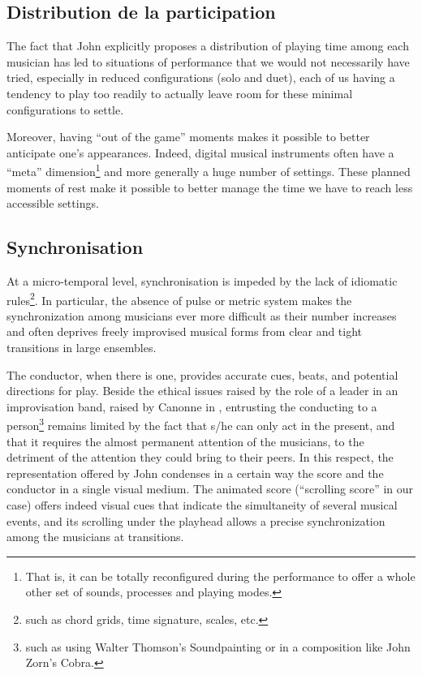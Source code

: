 \subsection{Distribution de la participation}

The fact that John explicitly proposes a distribution of playing time among each musician has led to situations of performance that we would not necessarily have tried, especially in reduced configurations (solo and duet), each of us having a tendency to play too readily to actually leave room for these minimal configurations to settle.

Moreover, having “out of the game” moments makes it possible to better anticipate one's appearances. Indeed, digital musical instruments often have a “meta” dimension\footnote{That is, it can be totally reconfigured during the performance to offer a whole other set of sounds, processes and playing modes.} and more generally a huge number of settings. These planned moments of rest make it possible to better manage the time we have to reach less accessible settings.

\subsection{Synchronisation}

At a micro-temporal level, synchronisation is impeded by the lack of idiomatic rules\footnote{such as chord grids, time signature, scales, etc.}. In particular, the absence of pulse or metric system makes the synchronization among musicians ever more difficult as their number increases and often deprives freely improvised musical forms from clear and tight transitions in large ensembles.

The conductor, when there is one, provides accurate cues, beats, and potential directions for play. Beside the ethical issues raised by the role of a leader in an improvisation band, raised by Canonne in \cite{canonne_improvisation_2012}, entrusting the conducting to a person\footnote{such as using Walter Thomson's Soundpainting or in a composition like John Zorn's Cobra.} remains limited by the fact that s/he can only act in the present, and that it requires the almost permanent attention of the musicians, to the detriment of the attention they could bring to their peers. In this respect, the representation offered by John condenses in a certain way the score and the conductor in a single visual medium. The animated score (“scrolling score” in our case) offers indeed visual cues that indicate the simultaneity of several musical events, and its scrolling under the playhead allows a precise synchronization among the musicians at transitions.

